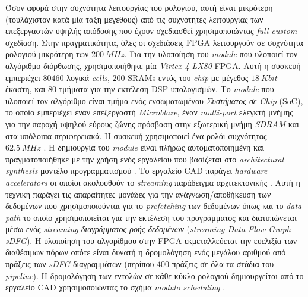 Όσον αφορά στην συχνότητα λειτουργίας του ρολογιού, αυτή είναι μικρότερη (τουλάχιστον κατά μία τάξη μεγέθους) από τις συχνότητες λειτουργίας των επεξεργαστών υψηλής απόδοσης που έχουν σχεδιασθεί χρησιμοποιώντας \textsl{full custom} σχεδίαση. Στην πραγματικότητα, όλες οι σχεδιάσεις \ac{FPGA} λειτουργούν σε συχνότητα ρολογιού μικρότερη των \(200\ MHz\).\newline \indent
Για την υλοποίηση του \textsl{module} που υλοποιεί τον αλγόριθμο διόρθωσης, χρησιμοποιήθηκε μία \textsl{Virtex-4 LX80} \ac{FPGA}. Αυτή η συσκευή εμπεριέχει \(80460\) λογικά \textsl{cells}, \(200\) \ac{SRAMs} εντός του \textsl{chip} με μέγεθος \(18\ Kbit\) έκαστη, και \(80\) τμήματα για την εκτέλεση \ac{DSP} υπολογισμών. Το \textsl{module} που υλοποιεί τον αλγόριθμο είναι τμήμα ενός ενσωματωμένου \textsl{Συστήματος σε Chip} (\ac{SoC}), το οποίο εμπεριέχει έναν επεξεργαστή \textsl{Microblaze}, έναν \textsl{multi-port} ελεγκτή μνήμης για την παροχή υψηλού εύρους ζώνης πρόσβαση στην εξωτερική μνήμη \textsl{SDRAM} και στα υπόλοιπα περιφερειακά. Η συσκευή χρησιμοποιεί ένα ρολόι συχνότητας \(62.5\ MHz\) \cite{xilinx}.\newline \indent
Η δημιουργία του \textsl{module} είναι πλήρως αυτοματοποιημένη και πραγματοποιήθηκε με την χρήση ενός εργαλείου που βασίζεται στο \textsl{architectural synthesis} μοντέλο προγραμματισμού \cite{BellasFCCM}. Το εργαλείο \ac{CAD} παράγει \textsl{hardware accelerators} οι οποίοι ακολουθούν το \textsl{streaming} παράδειγμα αρχιτεκτονικής \cite{AmarasingheThies}. Αυτή η τεχνική παράγει τις απαραίτητες μονάδες για την ανάγνωση/αποθήκευση των δεδομένων που χρησιμοποιούνται για το \textsl{prefetching} των δεδομένων όπως και το \textsl{data path} το οποίο χρησιμοποιείται για την εκτέλεση του προγράμματος και διατυπώνεται μέσω ενός \textsl{streaming διαγράμματος ροής δεδομένων} (\textsl{streaming Data Flow Graph - sDFG}).\newline \indent
Η υλοποίηση του αλγορίθμου στην \ac{FPGA} εκμεταλλεύεται την ευελιξία των διαθέσιμων πόρων οπότε είναι δυνατή η δρομολόγηση ενός μεγάλου αριθμού από πράξεις των \textsl{sDFG} διαγραμμάτων (περίπου \(400\) πράξεις σε όλα τα στάδια του \textsl{pipeline}). Η δρομολόγηση των εντολών σε κάθε κύκλο ρολογιού δημιουργείται από το εργαλείο \ac{CAD} χρησιμοποιώντας το σχήμα \textsl{modulo scheduling} \cite{moduloScheduling}.

